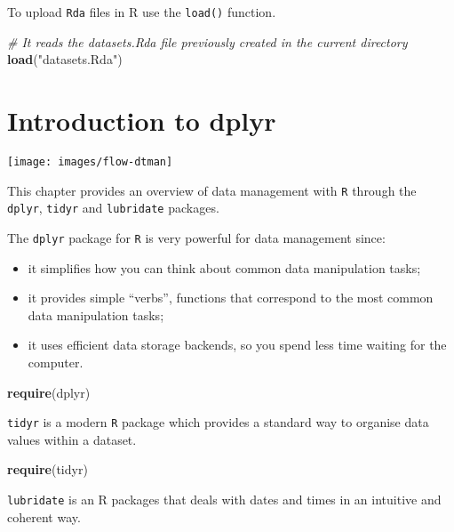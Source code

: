 \documentclass[]{book}
\newenvironment{Shaded}{\begin{snugshade}}{\end{snugshade}}
\newcommand{\KeywordTok}[1]{\textcolor[rgb]{0.13,0.29,0.53}{\textbf{{#1}}}}
\newcommand{\StringTok}[1]{\textcolor[rgb]{0.31,0.60,0.02}{{#1}}}
\newcommand{\CommentTok}[1]{\textcolor[rgb]{0.56,0.35,0.01}{\textit{{#1}}}}
\newcommand{\NormalTok}[1]{{#1}}
\providecommand{\tightlist}{%
  \setlength{\itemsep}{0pt}\setlength{\parskip}{0pt}}
\def\tightlist{}
\begin{document}
To upload \texttt{Rda} files in R use the \texttt{load()} function.

\begin{Shaded}
\begin{Highlighting}[]
\CommentTok{# It reads the datasets.Rda file previously created in the current directory}
\KeywordTok{load}\NormalTok{(}\StringTok{"datasets.Rda"}\NormalTok{)}
\end{Highlighting}
\end{Shaded}

\chapter{Introduction to dplyr}\label{introduction-to-dplyr}

\texttt{[image: images/flow-dtman]}

This chapter provides an overview of data management with \texttt{R}
through the \texttt{dplyr}, \texttt{tidyr} and \texttt{lubridate}
packages.

The \texttt{dplyr} package for \texttt{R} is very powerful for data
management since:

\begin{itemize}
\tightlist
\item
  it simplifies how you can think about common data manipulation tasks;
\item
  it provides simple ``verbs'', functions that correspond to the most
  common data manipulation tasks;
\item
  it uses efficient data storage backends, so you spend less time
  waiting for the computer.
\end{itemize}

\begin{Shaded}
\begin{Highlighting}[]
\KeywordTok{require}\NormalTok{(dplyr)}
\end{Highlighting}
\end{Shaded}

\texttt{tidyr} is a modern \texttt{R} package which provides a standard
way to organise data values within a dataset.

\begin{Shaded}
\begin{Highlighting}[]
\KeywordTok{require}\NormalTok{(tidyr)}
\end{Highlighting}
\end{Shaded}

\texttt{lubridate} is an R packages that deals with dates and times in
an intuitive and coherent way.
\end{document}
